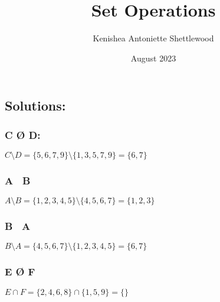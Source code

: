 \documentclass{article}
\title{Set Operations}
\author{Kenishea Antoniette Shettlewood}
\date{August 2023}
\begin{document}
\maketitle

\subsection{Solutions: }

\subsubsection{C Ø D: }

\(C \setminus D = \{5, 6, 7, 9\} \setminus \{1, 3, 5, 7, 9\} = \{6, 7\}\)

\subsubsection{A \ B}
\(A \setminus B = \{1, 2, 3, 4, 5\} \setminus \{4, 5, 6, 7\} = \{1, 2, 3\}\)

\subsubsection{B \ A}
\(B \setminus A = \{4, 5, 6, 7\} \setminus \{1, 2, 3, 4, 5\} = \{6, 7\}\)

\subsubsection{E Ø F}
\(E \cap F = \{2, 4, 6, 8\} \cap \{1, 5, 9\} = \{\}\)
\end{document}
